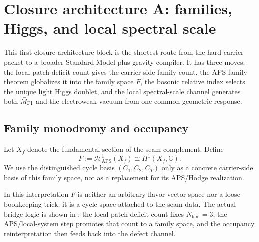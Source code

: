 \section{Closure architecture A: families, Higgs, and local spectral scale}

This first closure-architecture block is the shortest route from the hard carrier packet to a broader Standard Model plus gravity compiler. It has three moves: the local patch-deficit count gives the carrier-side family count, the APS family theorem globalizes it into the family space $F$, the bosonic relative index selects the unique light Higgs doublet, and the local spectral-scale channel generates both $\bar M_{\mathrm{Pl}}$ and the electroweak vacuum from one common geometric response.

\subsection{Family monodromy and occupancy}

\begin{definition}
Let $X_f$ denote the fundamental section of the seam complement. Define
\[
F:=\mathcal H^1_{\mathrm{APS}}(X_f)\cong H^1(X_f,\mathbb C).
\]
We use the distinguished cycle basis $(C_1,C_2,C_T)$ only as a concrete carrier-side basis of this family space, not as a replacement for its APS/Hodge realization.
\end{definition}
In this interpretation $F$ is neither an arbitrary flavor vector space nor a loose bookkeeping trick; it is a cycle space attached to the seam data. The actual bridge logic is shown in : the local patch-deficit count fixes $N_{\mathrm{fam}}=3$, the APS/local-system step promotes that count to a family space, and the occupancy reinterpretation then feeds back into the defect channel.

